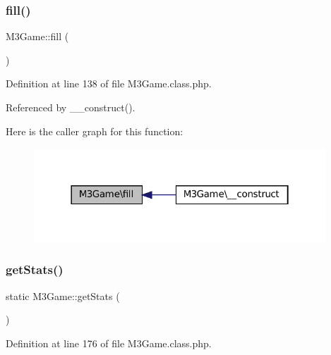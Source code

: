 \subsubsection{\texorpdfstring{fill()}{fill()}}
{\footnotesize\ttfamily M3\+Game\+::fill (\begin{DoxyParamCaption}{ }\end{DoxyParamCaption})\hspace{0.3cm}{\ttfamily [protected]}}



Definition at line 138 of file M3\+Game.\+class.\+php.



Referenced by \+\_\+\+\_\+construct().

Here is the caller graph for this function\+:\nopagebreak
\begin{figure}[H]
\begin{center}
\leavevmode
\includegraphics[width=310pt]{class_m3_game_a518b82c571e5b00f48e3898b948cfdc1_icgraph}
\end{center}
\end{figure}
\mbox{\label{class_m3_game_aaf1ddd0b90e0344509b0725546875f90}} 
\subsubsection{\texorpdfstring{get\+Stats()}{getStats()}}
{\footnotesize\ttfamily static M3\+Game\+::get\+Stats (\begin{DoxyParamCaption}{ }\end{DoxyParamCaption})\hspace{0.3cm}{\ttfamily [static]}}



Definition at line 176 of file M3\+Game.\+class.\+php.

\mbox{\label{class_m3_game_a5743cdeed815caf98e1cc1df18d1e646}} 
